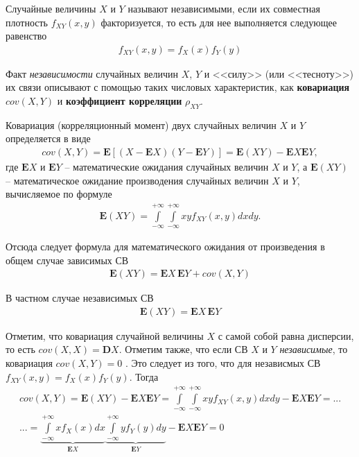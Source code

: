 \documentclass[%
	11pt,
	a4paper,
	utf8,
		]{article}
\begin{document}
Случайные величины $ X $ и $ Y $ называют независимыми, если их совместная плотность $ f_{XY}(x, y) $ факторизуется, то есть для нее выполняется следующее равенство \cite[]{shulenin:param}
\begin{align*}
	f_{XY}(x, y) = f_X(x) f_Y(y)
\end{align*}

Факт \emph{независимости} случайных величин $ X $, $ Y $  и <<силу>> (или <<тесноту>>) их связи описывают с помощью таких числовых характеристик, как \textbf{ковариация} $ cov(X, Y) $ и \textbf{коэффициент корреляции} $ \rho_{XY} $.

Ковариация (корреляционный момент) двух случайных величин $ X $ и $ Y $ определяется в виде
\begin{align*}
	cov(X, Y) = \mathbf{E}[ (X - \mathbf{E}X)( Y - \mathbf{E}Y) ] = \mathbf{E}(XY) - \mathbf{E}X \mathbf{E}Y,
\end{align*}
где $ \mathbf{E}X $ и $ \mathbf{E}Y $ -- математические ожидания случайных величин $ X $ и $ Y $, а $ \mathbf{E}(XY) $ -- математическое ожидание производения случайных величин $ X $ и $ Y $, вычисляемое по формуле
\begin{align*}
	\mathbf{E}(XY)  = \int\limits_{-\infty}^{+\infty} \int\limits_{-\infty}^{+\infty} xy f_{XY}(x, y) dx dy.
\end{align*}

Отсюда следует формула для математического ожидания от произведения в общем случае зависимых СВ
\begin{align*}
	 \mathbf{E}(XY) = \mathbf{E}X \, \mathbf{E}Y + cov(X, Y)
\end{align*}

В частном случае независимых СВ
\begin{align*}
	\mathbf{E}(XY) = \mathbf{E}X \, \mathbf{E}Y
\end{align*}

Отметим, что ковариация случайной величины $ X $ с самой собой равна дисперсии, то есть $ cov(X, X) = \mathbf{D}X $. Отметим также, что если СВ $ X $ и $ Y $ \emph{независимые}, то ковариация $ cov(X, Y) = 0 $ \cite[]{shulenin:param}. Это следует из того, что для независмых СВ $ f_{XY}(x, y) = f_X(x) f_Y(y) $. Тогда
\begin{multline*}
	 cov(X, Y) = \mathbf{E}(XY) - \mathbf{E}X \mathbf{E}Y = \int\limits_{-\infty}^{+\infty} \int\limits_{-\infty}^{+\infty} xy f_{XY}(x, y) dx dy - \mathbf{E}X \mathbf{E}Y =...\\ ...=\underbrace{\int\limits_{-\infty}^{+\infty} x f_{X}(x) dx}_{\mathbf{E}X} \underbrace{\int\limits_{-\infty}^{+\infty} y f_{Y}(y) dy}_{\mathbf{E}Y} - \mathbf{E}X \mathbf{E}Y = 0
\end{multline*}
\end{document}
